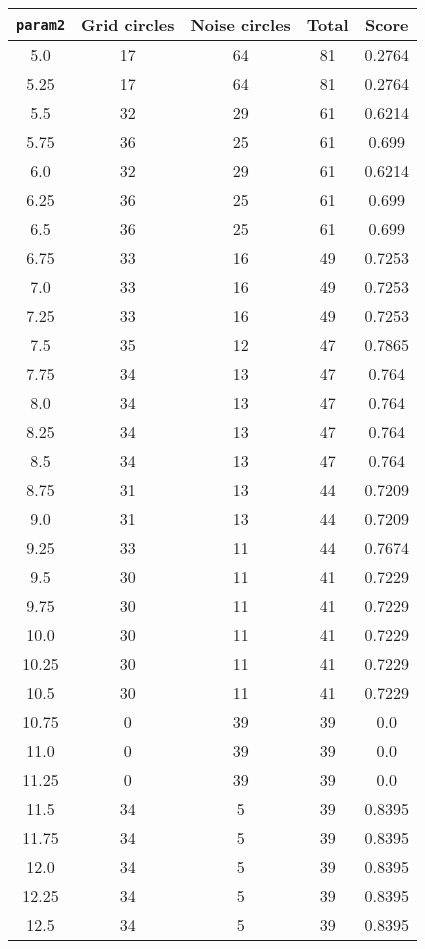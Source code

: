 \documentclass[letterpaper, 12pt]{article}
\begin{document}
\begin{longtable}{|c|c|c|c|c|}
\hline
\textbf{\texttt{param2}} & \textbf{Grid circles} & \textbf{Noise circles} & \textbf{Total} & \textbf{Score} \\
\hline
5.0 & 17 & 64 & 81 & 0.2764 \\
\hline
5.25 & 17 & 64 & 81 & 0.2764 \\
\hline
5.5 & 32 & 29 & 61 & 0.6214 \\
\hline
5.75 & 36 & 25 & 61 & 0.699 \\
\hline
6.0 & 32 & 29 & 61 & 0.6214 \\
\hline
6.25 & 36 & 25 & 61 & 0.699 \\
\hline
6.5 & 36 & 25 & 61 & 0.699 \\
\hline
6.75 & 33 & 16 & 49 & 0.7253 \\
\hline
7.0 & 33 & 16 & 49 & 0.7253 \\
\hline
7.25 & 33 & 16 & 49 & 0.7253 \\
\hline
7.5 & 35 & 12 & 47 & 0.7865 \\
\hline
7.75 & 34 & 13 & 47 & 0.764 \\
\hline
8.0 & 34 & 13 & 47 & 0.764 \\
\hline
8.25 & 34 & 13 & 47 & 0.764 \\
\hline
8.5 & 34 & 13 & 47 & 0.764 \\
\hline
8.75 & 31 & 13 & 44 & 0.7209 \\
\hline
9.0 & 31 & 13 & 44 & 0.7209 \\
\hline
9.25 & 33 & 11 & 44 & 0.7674 \\
\hline
9.5 & 30 & 11 & 41 & 0.7229 \\
\hline
9.75 & 30 & 11 & 41 & 0.7229 \\
\hline
10.0 & 30 & 11 & 41 & 0.7229 \\
\hline
10.25 & 30 & 11 & 41 & 0.7229 \\
\hline
10.5 & 30 & 11 & 41 & 0.7229 \\
\hline
10.75 & 0 & 39 & 39 & 0.0 \\
\hline
11.0 & 0 & 39 & 39 & 0.0 \\
\hline
11.25 & 0 & 39 & 39 & 0.0 \\
\hline
11.5 & 34 & 5 & 39 & 0.8395 \\
\hline
11.75 & 34 & 5 & 39 & 0.8395 \\
\hline
12.0 & 34 & 5 & 39 & 0.8395 \\
\hline
12.25 & 34 & 5 & 39 & 0.8395 \\
\hline
12.5 & 34 & 5 & 39 & 0.8395 \\

\end{longtable}
\end{document}
